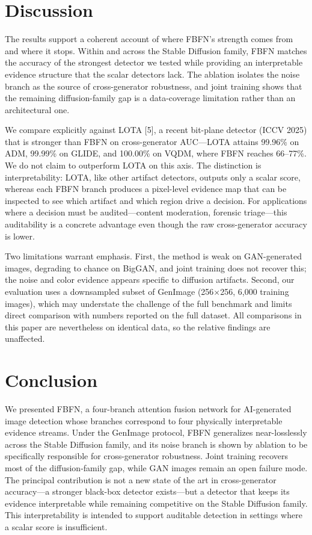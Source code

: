 \documentclass[11pt,a4paper]{article}
\begin{document}
\section{Discussion}

The results support a coherent account of where FBFN's strength comes from and where it stops. Within and across the Stable Diffusion family, FBFN matches the accuracy of the strongest detector we tested while providing an interpretable evidence structure that the scalar detectors lack. The ablation isolates the noise branch as the source of cross-generator robustness, and joint training shows that the remaining diffusion-family gap is a data-coverage limitation rather than an architectural one.

We compare explicitly against LOTA [5], a recent bit-plane detector (ICCV 2025) that is stronger than FBFN on cross-generator AUC---LOTA attains 99.96\% on ADM, 99.99\% on GLIDE, and 100.00\% on VQDM, where FBFN reaches 66--77\%. We do not claim to outperform LOTA on this axis. The distinction is interpretability: LOTA, like other artifact detectors, outputs only a scalar score, whereas each FBFN branch produces a pixel-level evidence map that can be inspected to see which artifact and which region drive a decision. For applications where a decision must be audited---content moderation, forensic triage---this auditability is a concrete advantage even though the raw cross-generator accuracy is lower.

Two limitations warrant emphasis. First, the method is weak on GAN-generated images, degrading to chance on BigGAN, and joint training does not recover this; the noise and color evidence appears specific to diffusion artifacts. Second, our evaluation uses a downsampled subset of GenImage (256$\times$256, 6,000 training images), which may understate the challenge of the full benchmark and limits direct comparison with numbers reported on the full dataset. All comparisons in this paper are nevertheless on identical data, so the relative findings are unaffected.

\section{Conclusion}

We presented FBFN, a four-branch attention fusion network for AI-generated image detection whose branches correspond to four physically interpretable evidence streams. Under the GenImage protocol, FBFN generalizes near-losslessly across the Stable Diffusion family, and its noise branch is shown by ablation to be specifically responsible for cross-generator robustness. Joint training recovers most of the diffusion-family gap, while GAN images remain an open failure mode. The principal contribution is not a new state of the art in cross-generator accuracy---a stronger black-box detector exists---but a detector that keeps its evidence interpretable while remaining competitive on the Stable Diffusion family. This interpretability is intended to support auditable detection in settings where a scalar score is insufficient.
\end{document}
